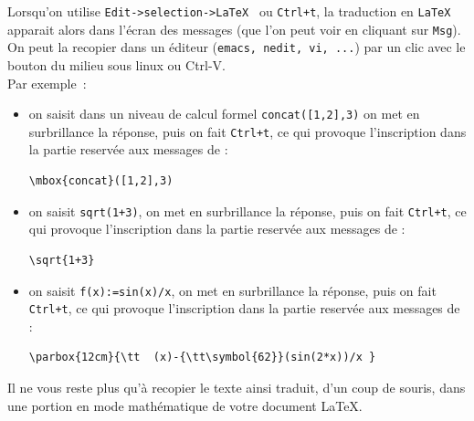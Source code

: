 \documentclass[a4paper,11pt]{article}
\begin{document}
\begin{itemize}
Lorsqu'on utilise {\tt Edit->selection->LaTeX } ou {\tt Ctrl+t}, la traduction 
en {\tt LaTeX} apparait alors dans l'\'ecran des messages (que l'on peut voir 
en cliquant sur {\tt Msg}).
On peut la recopier dans un \'editeur ({\tt emacs, nedit, vi, ...})
par un clic avec le bouton du milieu sous linux ou Ctrl-V.\\
Par exemple~:
\begin{itemize}
\item
on saisit dans un niveau de calcul formel {\tt concat([1,2],3)}
 on met en surbrillance la r\'eponse, puis on fait {\tt Ctrl+t},
ce qui provoque l'inscription dans la partie reserv\'ee aux messages de :
\begin{verbatim}
\mbox{concat}([1,2],3)
\end{verbatim}
\item
on saisit {\tt sqrt(1+3)},  on met en surbrillance la r\'eponse, puis on fait 
{\tt Ctrl+t}, ce qui provoque l'inscription dans la partie reserv\'ee aux 
messages de :
\begin{verbatim}
\sqrt{1+3}
\end{verbatim}
\item
on saisit {\tt f(x):=sin(x)/x}, on met en surbrillance la r\'eponse, puis on 
fait {\tt Ctrl+t}, ce qui provoque l'inscription dans la partie reserv\'ee aux 
messages de :
\begin{verbatim}
\parbox{12cm}{\tt  (x)-{\tt\symbol{62}}(sin(2*x))/x }
\end{verbatim}
\end{itemize}
Il ne vous reste plus qu'\`a recopier le texte ainsi traduit, d'un coup de 
souris, dans une portion en mode math\'ematique de votre document \LaTeX.


\end{itemize}
\end{document}

